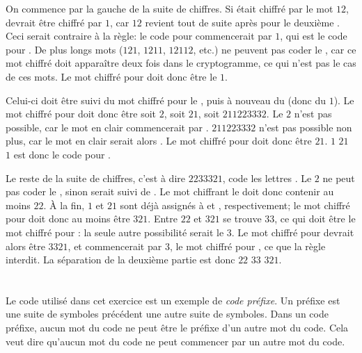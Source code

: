 {{On commence par la gauche de la suite de chiffres. Si  était chiffré par le mot $12$,  devrait être chiffré par $1$, car $12$ revient tout de suite après pour le deuxième . Ceci serait contraire à la règle: le code pour  commencerait par $1$, qui est le code pour . De plus longs mots ($121$, $1211$, $12112$, etc.) ne peuvent pas coder le , car ce mot chiffré doit apparaître deux fois dans le cryptogramme, ce qui n’est pas le cas de ces mots. Le mot chiffré pour  doit donc être le $1$.

Celui-ci doit être suivi du mot chiffré pour le , puis à nouveau du  (donc du $1$). Le mot chiffré pour  doit donc être soit $2$, soit $21$, soit $211223332$. Le $2$ n’est pas possible, car le mot en clair commencerait par . $211223332$ n’est pas possible non plus, car le mot en clair serait alors . Le mot chiffré pour  doit donc être $21$. $1$ $21$ $1$ est donc le code pour .

Le reste de la suite de chiffres, c’est à dire $2233321$, code les lettres . Le $2$ ne peut pas coder le , sinon  serait suivi de . Le mot chiffrant le  doit donc contenir au moins $22$. À la fin, $1$ et $21$ sont déjà assignés à  et , respectivement; le mot chiffré pour  doit donc au moins être $321$. Entre $22$ et $321$ se trouve $33$, ce qui doit être le mot chiffré pour : la seule autre possibilité serait le $3$. Le mot chiffré pour  devrait alors être $3321$, et commencerait par $3$, le mot chiffré pour , ce que la règle interdit. La séparation de la deuxième partie est donc $22$ $33$ $321$.



\section*{\BrochureItsInformatics}
Le code utilisé dans cet exercice est un exemple de \emph{code préfixe}. Un préfixe est une suite de symboles précédent une autre suite de symboles. Dans un code préfixe, aucun mot du code ne peut être le préfixe d’un autre mot du code. Cela veut dire qu’aucun mot du code ne peut commencer par un autre mot du code.

}}
